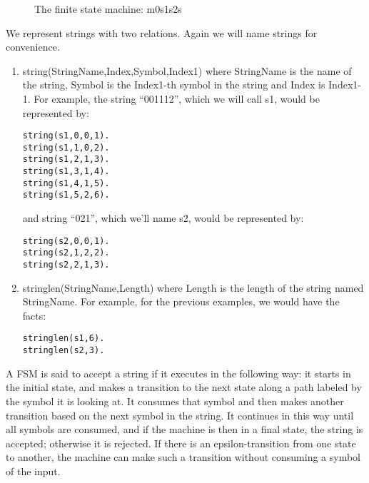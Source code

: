 \begin{figure}
\centerline{}
\caption{The finite state machine: m0s1s2s}\label{m0s1s2s}
\end{figure}

We represent strings with two relations.  Again we will name strings
for convenience.  
\begin{enumerate}
\item
string(StringName,Index,Symbol,Index1) where StringName is the name of
the string, Symbol is the Index1-th symbol in the string and Index is
Index1-1.  For example, the string ``001112'', which we will call s1,
would be represented by:
\begin{verbatim}
string(s1,0,0,1).
string(s1,1,0,2).
string(s1,2,1,3).
string(s1,3,1,4).
string(s1,4,1,5).
string(s1,5,2,6).
\end{verbatim}
and string ``021'', which we'll name s2, would be represented by:
\begin{verbatim}
string(s2,0,0,1).
string(s2,1,2,2).
string(s2,2,1,3).
\end{verbatim}

\item
stringlen(StringName,Length) where Length is the length of the string
named StringName.  For example, for the previous examples, we would
have the facts:
\begin{verbatim}
stringlen(s1,6).
stringlen(s2,3).
\end{verbatim}
\end{enumerate}

A FSM is said to accept a string if it executes in the following way:
it starts in the initial state, and makes a transition to the next
state along a path labeled by the symbol it is looking at.  It
consumes that symbol and then makes another transition based on the
next symbol in the string.  It continues in this way until all symbols
are consumed, and if the machine is then in a final state, the string
is accepted; otherwise it is rejected.  If there is an
epsilon-transition from one state to another, the machine can make
such a transition without consuming a symbol of the input.

